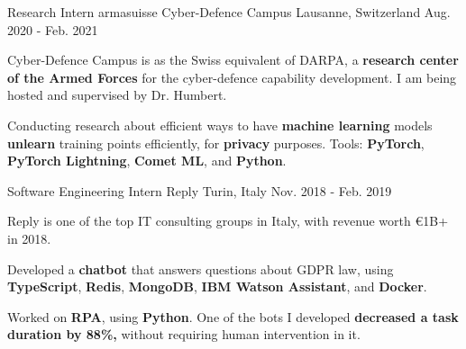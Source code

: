 

\begin{cventries}

  \cventry
    {Research Intern} %
    {armasuisse Cyber-Defence Campus} %
    {Lausanne, Switzerland} %
    {Aug. 2020 - Feb. 2021} %
    {
      \begin{cvitems} %
        \item Cyber-Defence Campus is as the Swiss equivalent of DARPA, a \textbf{research center of the Armed Forces} for the cyber-defence capability development. I am being hosted and supervised by Dr. Humbert.
        \item Conducting research about efficient ways to have \textbf{machine learning} models \textbf{unlearn} training points efficiently, for \textbf{privacy} purposes. Tools: \textbf{PyTorch}, \textbf{PyTorch Lightning}, \textbf{Comet ML}, and \textbf{Python}.
      \end{cvitems}
    }

  \cventry
    {Software Engineering Intern} %
    {Reply} %
    {Turin, Italy} %
    {Nov. 2018 - Feb. 2019} %
    {
      \begin{cvitems} %
        \item Reply is one of the top IT consulting groups in Italy, with revenue worth €1B+ in 2018.
        \item Developed a \textbf{chatbot} that answers questions about GDPR law, using \textbf{TypeScript}, \textbf{Redis}, \textbf{MongoDB}, \textbf{IBM Watson Assistant}, and \textbf{Docker}.
        \item Worked on \textbf{RPA}, using \textbf{Python}. One of the bots I developed \textbf{decreased a task duration by 88\%,} without requiring human intervention in it.
      \end{cvitems}
    }

\end{cventries}
